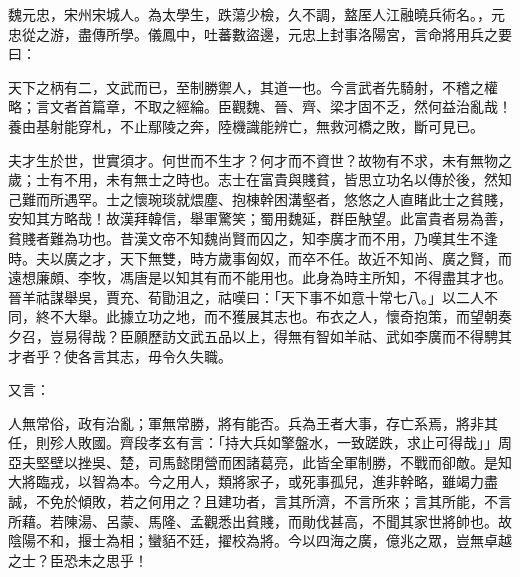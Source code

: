 
\begin{pinyinscope}

 魏元忠，宋州宋城人。為太學生，跌蕩少檢，久不調，盩厔人江融曉兵術名。，元忠從之游，盡傳所學。儀鳳中，吐蕃數盜邊，元忠上封事洛陽宮，言命將用兵之要曰：



 天下之柄有二，文武而已，至制勝禦人，其道一也。今言武者先騎射，不稽之權略；言文者首篇章，不取之經綸。臣觀魏、晉、齊、梁才固不乏，然何益治亂哉！養由基射能穿札，不止鄢陵之奔，陸機識能辨亡，無救河橋之敗，斷可見已。



 夫才生於世，世實須才。何世而不生才？何才而不資世？故物有不求，未有無物之歲；士有不用，未有無士之時也。志士在富貴與賤貧，皆思立功名以傳於後，然知己難而所遇罕。士之懷琬琰就煨塵、抱棟幹困溝壑者，悠悠之人直睹此士之貧賤，安知其方略哉！故漢拜韓信，舉軍驚笑；蜀用魏延，群臣觖望。此富貴者易為善，貧賤者難為功也。昔漢文帝不知魏尚賢而囚之，知李廣才而不用，乃嘆其生不逢時。夫以廣之才，天下無雙，時方歲事匈奴，而卒不任。故近不知尚、廣之賢，而遠想廉頗、李牧，馮唐是以知其有而不能用也。此身為時主所知，不得盡其才也。晉羊祜謀舉吳，賈充、荀勖沮之，祜嘆曰：「天下事不如意十常七八。」以二人不同，終不大舉。此據立功之地，而不獲展其志也。布衣之人，懷奇抱策，而望朝奏夕召，豈易得哉？臣願歷訪文武五品以上，得無有智如羊祜、武如李廣而不得騁其才者乎？使各言其志，毋令久失職。



 又言：



 人無常俗，政有治亂；軍無常勝，將有能否。兵為王者大事，存亡系焉，將非其任，則殄人敗國。齊段孝玄有言：「持大兵如擎盤水，一致蹉跌，求止可得哉」」周亞夫堅壁以挫吳、楚，司馬懿閉營而困諸葛亮，此皆全軍制勝，不戰而卻敵。是知大將臨戎，以智為本。今之用人，類將家子，或死事孤兒，進非幹略，雖竭力盡誠，不免於傾敗，若之何用之？且建功者，言其所濟，不言所來；言其所能，不言所藉。若陳湯、呂蒙、馬隆、孟觀悉出貧賤，而勛伐甚高，不聞其家世將帥也。故陰陽不和，揠士為相；蠻貊不廷，擢校為將。今以四海之廣，億兆之眾，豈無卓越之士？臣恐未之思乎！




\end{pinyinscope}
